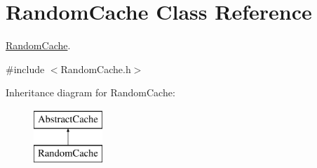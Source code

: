 \hypertarget{classRandomCache}{\section{\-Random\-Cache \-Class \-Reference}
\label{classRandomCache}
}


\hyperlink{classRandomCache}{\-Random\-Cache}.  




{\ttfamily \#include $<$\-Random\-Cache.\-h$>$}

\-Inheritance diagram for \-Random\-Cache\-:\begin{figure}[H]
\begin{center}
\leavevmode
\includegraphics[height=2.000000cm]{classRandomCache}
\end{center}
\end{figure}
